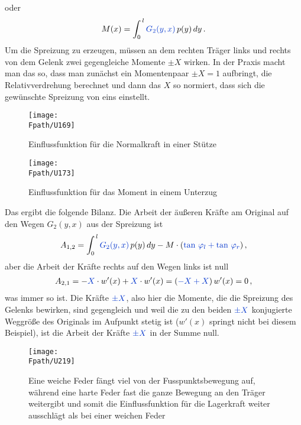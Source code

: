 oder
\begin{align}
M(x)  =  \int_0^{\,l} \textcolor{chapterTitleBlue}{G_2(y,x)}\,p(y)\,dy\,.
\end{align}
Um die Spreizung zu erzeugen, m\"{u}ssen an dem rechten Tr\"{a}ger links und rechts von dem Gelenk zwei gegengleiche Momente $\pm X$ wirken. In der Praxis macht man das so, dass man zun\"{a}chst ein Momentenpaar $\pm X = 1$ aufbringt, die Relativverdrehung berechnet und dann das $X$ so normiert, dass sich die gew\"{u}nschte Spreizung von eins einstellt.
\begin{figure}[tbp]
\centering
\if {} \sidecaption \fi
\texttt{[image: \\Fpath/U169]}
\caption{Einflussfunktion f\"{u}r die Normalkraft in einer St\"{u}tze} \label{U169}
\end{figure}%
\begin{figure}[tbp]
\centering
\if {} \sidecaption \fi
\texttt{[image: \\Fpath/U173]}
\caption{Einflussfunktion f\"{u}r das Moment in einem Unterzug} \label{U173}
\end{figure}%

Das ergibt die folgende Bilanz. Die Arbeit der \"{a}u{\ss}eren Kr\"{a}fte am Original auf den Wegen $G_2(y,x)$ aus der Spreizung ist
\begin{align}
A_{1,2} = \int_0^{\,l} \textcolor{chapterTitleBlue}{G_2(y,x)}\,p(y)\,dy - M \cdot (\textcolor{chapterTitleBlue}{\tan\,\Np_l + \tan\,\Np_r})\,,
\end{align}
aber die Arbeit der Kr\"{a}fte rechts auf den Wegen links ist null
\begin{align}\label{ImmerSo}
A_{2,1} = - \textcolor{chapterTitleBlue}{X} \cdot w'(x) + \textcolor{chapterTitleBlue}{X}\cdot w'(x) = (\textcolor{chapterTitleBlue}{-X + X})\,w'(x) = 0\,,
\end{align}
was immer so ist. Die Kr\"{a}fte $\textcolor{chapterTitleBlue}{\pm X} $, also hier die Momente, die die Spreizung des Gelenks bewirken, sind gegengleich und weil die zu den beiden $\textcolor{chapterTitleBlue}{\pm X}$ konjugierte Weggr\"{o}{\ss}e des Originals im Aufpunkt stetig ist ($w'(x)$ springt nicht bei diesem Beispiel), ist die Arbeit der Kr\"{a}fte $\textcolor{chapterTitleBlue}{\pm X}$ in der Summe null.\\
\begin{figure}[tbp]
\centering
\if {} \sidecaption \fi
\texttt{[image: \\Fpath/U219]}
\caption{Eine weiche Feder f\"{a}ngt viel von der Fusspunktsbewegung auf, w\"{a}hrend eine harte Feder fast die ganze Bewegung an den Tr\"{a}ger weitergibt und somit die Einflussfunktion f\"{u}r die Lagerkraft weiter ausschl\"{a}gt als bei einer weichen Feder} \label{U219}
\end{figure}%

